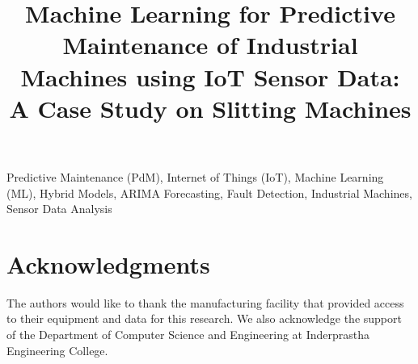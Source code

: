 \documentclass[conference]{IEEEtran}
\begin{document}
\title{Machine Learning for Predictive Maintenance of Industrial Machines using IoT Sensor Data: A Case Study on Slitting Machines\\
}

\author{
}

\maketitle



\begin{IEEEkeywords}
Predictive Maintenance (PdM), Internet of Things (IoT), Machine Learning (ML), Hybrid Models, ARIMA Forecasting, Fault Detection, Industrial Machines, Sensor Data Analysis
\end{IEEEkeywords}












\section*{Acknowledgments}
The authors would like to thank the manufacturing facility that provided access to their equipment and data for this research. We also acknowledge the support of the Department of Computer Science and Engineering at Inderprastha Engineering College.



\end{document}
